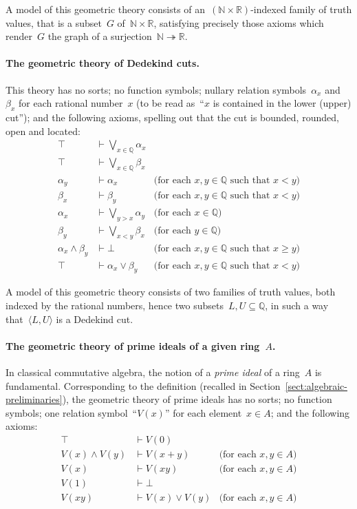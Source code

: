 \documentclass{ws-rv9x6}
\newcommand{\NN}{\mathbb{N}}
\newcommand{\QQ}{\mathbb{Q}}
\newcommand{\RR}{\mathbb{R}}
\renewcommand{\_}{\mathpunct{.}}
\newcommand{\?}{\,{:}\,}
\begin{document}
A model of this geometric theory consists of an~$(\NN \times \RR)$-indexed
family of truth values, that is a subset~$G$ of~$\NN \times \RR$, satisfying
precisely those axioms which render~$G$ the graph of a surjection~$\NN
\twoheadrightarrow \RR$.

\paragraph{The geometric theory of Dedekind cuts.}\label{par:dedekind-cuts}
This theory has no sorts; no
function symbols; nullary relation symbols~$\alpha_x$ and~$\beta_x$ for each
rational number~$x$ (to be read as~``$x$ is contained in the lower (upper)
cut''); and the following axioms, spelling out that the cut is bounded,
rounded, open and located:
\begin{align*}
  \top &\vdash \textstyle\bigvee_{x \in \QQ} \alpha_x \\
  \top &\vdash \textstyle\bigvee_{x \in \QQ} \beta_x \\
  \alpha_y &\vdash \alpha_x & \text{(for each~$x,y \in \QQ$ such that~$x < y$)} \\
  \beta_x &\vdash \beta_y & \text{(for each~$x,y \in \QQ$ such that~$x < y$)} \\
  \alpha_x &\vdash \textstyle\bigvee_{y > x} \alpha_y & \text{(for each~$x \in \QQ$)} \\
  \beta_y &\vdash \textstyle\bigvee_{x < y} \beta_x & \text{(for each~$y \in \QQ$)} \\
  \alpha_x \wedge \beta_y &\vdash \bot & \text{(for each~$x,y \in \QQ$ such that~$x \geq y$)} \\
  \top &\vdash \alpha_x \vee \beta_y & \text{(for each~$x,y \in \QQ$ such that~$x < y$)}
\end{align*}

A model of this geometric theory consists of two families of truth values, both
indexed by the rational numbers, hence two subsets~$L,U \subseteq \QQ$, in such
a way that~$\langle L,U \rangle$ is a Dedekind cut.

\paragraph{The geometric theory of prime ideals of a given ring~$A$.} In classical
commutative algebra, the notion of a \emph{prime ideal} of a ring~$A$ is
fundamental. Corresponding to the definition (recalled in
Section~\ref{sect:algebraic-preliminaries}), the geometric theory of prime
ideals has no sorts; no function
symbols; one relation symbol~``$V(x)$'' for each element~$x \in A$; and the
following axioms:
\begin{align*}
  \top &\vdash V(0) \\
  V(x) \wedge V(y) &\vdash V(x+y) & \text{(for each~$x,y \in A$)} \\
  V(x) &\vdash V(xy) & \text{(for each~$x,y \in A$)} \\
  V(1) &\vdash \bot \\
  V(xy) &\vdash V(x) \vee V(y) & \text{(for each~$x,y \in A$)}
\end{align*}
\end{document}
